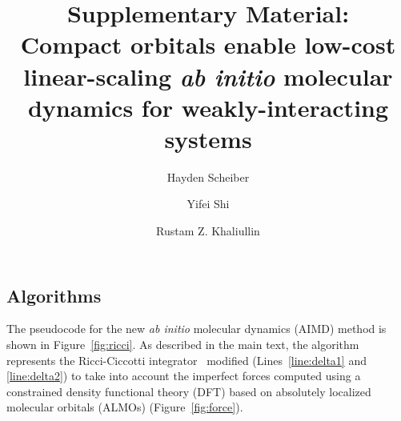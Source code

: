 \documentclass[aip,jcp,reprint,amsmath,amssymb]{revtex4-1}
\begin{document}
\renewcommand{\thefigure}{S\arabic{figure}}

\title{
Supplementary Material: \\
Compact orbitals enable low-cost linear-scaling \emph{ab initio} molecular dynamics for weakly-interacting systems
}

\author{Hayden Scheiber}
\author{Yifei Shi}
\author{Rustam Z. Khaliullin}

\maketitle

\subsection{Algorithms}

The pseudocode for the new \emph{ab initio} molecular dynamics (AIMD) method is shown in Figure~\ref{fig:ricci}. As described in the main text, the algorithm represents the Ricci-Ciccotti integrator~\cite{Ricci2003} modified (Lines~\ref{line:delta1} and \ref{line:delta2}) to take into account the imperfect forces computed using a constrained density functional theory (DFT) based on absolutely localized molecular orbitals (ALMOs) (Figure~\ref{fig:force}). 
\end{document}
